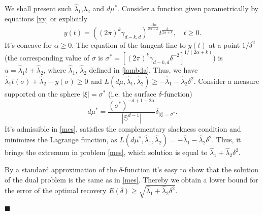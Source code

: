\documentclass[12pt]{iopart}
\newenvironment{proof}
{\par\noindent{\bf Proof}}
{\hfill$\scriptstyle\blacksquare$}
\begin{document}
\begin{proof}
We shall present such $\widehat\lambda_1$,$\widehat\lambda_2$ and $d\mu^*$.
Consider a function given parametrically by equations \eqref{xy} or explicitly
 \[
y(t)=((2\pi)^k\gamma_{d-k,d})^{\frac{-2\alpha}{2\alpha+k}}t^{\frac{k}{2\alpha+k}},\quad t\ge 0.
\]
It's concave for $\alpha\geqslant 0$. The equation of the tangent line to $y(t)$ at a point $1/\delta^2$ (the corresponding value of $\sigma$ is $\sigma^*=[(2\pi)^k\gamma_{d-k,d}\delta^{-2}]^{1/(2\alpha+k)}$)
is $u=\widehat\lambda_1t+\widehat\lambda_2$, where
$\widehat\lambda_1$, $\widehat\lambda_2$ defined in
\eqref{lambda}. Thus, we have
$\widehat\lambda_1t(\sigma)+\widehat\lambda_2-y(\sigma)\geqslant 0$ and
$L(d\mu,\widehat\lambda_1,\widehat\lambda_2)\geqslant
-\widehat\lambda_1-\widehat\lambda_2\delta^2.$
Consider a measure supported on the sphere $|\xi|=\sigma^* $ (i.e. the surface $\delta$-function) 
  $$
  d\mu^*=\frac{(\sigma^*)^{-d+1-2\alpha}}{|\mathbb S^{d-1}|}\delta_{|\xi|=\sigma^*}.
$$ 
It's admissible in \eqref{mes}, satisfies the complementary slackness condition and minimizes the Lagrange function, as $L(d\mu^*,\widehat\lambda_1,\widehat\lambda_2)=-\widehat\lambda_1-\widehat\lambda_2\delta^2$. Thus, it brings the extremum in problem \eqref{mes}, which solution is equal to $\widehat\lambda_1+\widehat\lambda_2\delta^2$.

By a standard approximation of the $\delta$-function it's easy to show that the solution of the dual problem is the same as in \eqref{mes}. Thereby we obtain a lower bound for the error of the optimal recovery $E(\delta)\ge\sqrt{\widehat\lambda_1+\widehat\lambda_2\delta^2}$.


\end{proof}
\end{document}
